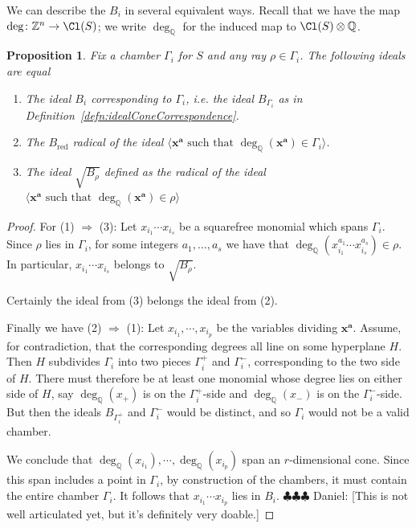 \documentclass[11pt]{amsart}
\numberwithin{equation}{section}
\newtheorem{prop}[equation]{Proposition}
\theoremstyle{definition}
\theoremstyle{remark}
\newcommand{\ZZ}{\mathbb Z}
\newcommand{\QQ}{\mathbb Q}
\newcommand{\daniel}[1]{{\color{blue} \sf $\clubsuit\clubsuit\clubsuit$ Daniel: [#1]}}
\begin{document}
We can describe the $B_i$ in several equivalent ways.  Recall that we have the map $\deg\colon \ZZ^n\to \Cl(S)$; we write $\deg_{\QQ}$ for the induced map to $\Cl(S)\otimes \QQ$.
\begin{prop}
    Fix a chamber $\Gamma_i$ for $S$ and any ray $\rho \in \Gamma_i$.  The following ideals are equal
    \begin{enumerate}
        \item  The ideal $B_i$ corresponding to $\Gamma_i$, i.e. the ideal $B_{\Gamma_i}$ as in Definition~\ref{defn:idealConeCorrespondence}.
        \item  The $B_{\text{red}}$ radical of the ideal $\langle \mathbf{x}^{\mathbf{a}} \text{ such that } \deg_{\QQ}(\mathbf{x}^{\mathbf{a}})\in \Gamma_i\rangle$.
        \item  The ideal $\sqrt{B_{\rho}}$ defined as the radical of the ideal $\langle \mathbf{x}^{\mathbf{a}} \text{ such that } \deg_{\QQ}(\mathbf{x}^{\mathbf{a}})\in \rho \rangle$
    \end{enumerate}
\end{prop}
\begin{proof}
For (1) $\Rightarrow$ (3): Let $x_{i_1}\cdots x_{i_s}$ be a squarefree monomial which spans $\Gamma_i$.  Since $\rho$ lies in $\Gamma_i$, for some integers $a_1, \dots, a_s$ we have that $\deg_{\QQ}(x_{i_1}^{a_1}\cdots x_{i_s}^{a_s}) \in \rho$.  In particular, $x_{i_1}\cdots x_{i_s}$ belongs to $\sqrt{B_{\rho}}$.

Certainly the ideal from (3) belongs the ideal from (2).

Finally we have (2) $\Rightarrow$ (1):  Let $x_{i_1}, \cdots, x_{i_p}$ be the variables dividing $\mathbf{x}^{\mathbf{a}}$.  Assume, for contradiction, that the corresponding degrees all line on some hyperplane $H$.  Then $H$ subdivides $\Gamma_i$ into two pieces $\Gamma_i^{+}$ and $\Gamma_i^{-}$, corresponding to the two side of $H$.  There must therefore be at least one monomial whose degree lies on either side of $H$, say $\deg_{\QQ}(x_{+})$ is on the $\Gamma_i^{+}$-side and $\deg_{\QQ}(x_{-})$ is on the $\Gamma_i^{-}$-side.  But then the ideals $B_{\Gamma_i^{+}}$ and $\Gamma_i^{-}$ would be distinct, and so $\Gamma_i$ would not be a valid chamber.

We conclude that $\deg_{\QQ}(x_{i_1}), \cdots, \deg_{\QQ}(x_{i_p})$ span an $r$-dimensional cone.  Since this span includes a point in $\Gamma_i$, by construction of the chambers, it must contain the entire chamber $\Gamma_i$.  It follows that $x_{i_1}\cdots x_{i_p}$ lies in $B_i$.
\daniel{This is not well articulated yet, but it's definitely very doable.}
\end{proof}
\end{document}
